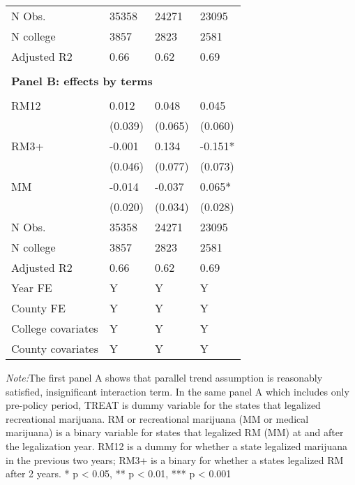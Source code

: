 \documentclass[12pt]{article}%
\begin{document}
\begin{table}
\begin{threeparttable}
\begin{tabular}{llll}
\cline{2-4} 
N Obs. & 35358 & 24271 & 23095 \\
N college & 3857 & 2823 & 2581 \\
Adjusted R2 & 0.66 & 0.62 & 0.69 \\
\hline \\[-1.8ex] 
\multicolumn{4}{l}{\textbf{Panel B: effects by terms}}\\  \\[-1.8ex] 
RM12 & 0.012 & 0.048 & 0.045 \\
& (0.039) & (0.065) & (0.060) \\
RM3+ & -0.001 & 0.134 & -0.151* \\
& (0.046) & (0.077) & (0.073) \\
MM & -0.014 & -0.037 & 0.065* \\
& (0.020) & (0.034) & (0.028) \\
\cline{2-4} 
N Obs. & 35358 & 24271 & 23095 \\
N college & 3857 & 2823 & 2581 \\
Adjusted R2 & 0.66 & 0.62 & 0.69 \\
\midrule
Year FE & Y & Y & Y \\
County FE & Y & Y & Y \\
College covariates & Y & Y & Y \\
County covariates & Y & Y & Y \\
\bottomrule
\end{tabular}
  \end{threeparttable}
 
\end{table}
\FloatBarrier

\textit{Note:}The first panel A shows that parallel trend assumption is reasonably satisfied, insignificant interaction term. In the same panel A which includes only pre-policy period, TREAT is dummy variable for the states that legalized recreational marijuana. RM or recreational marijuana (MM or medical marijuana) is a binary variable for states that legalized RM (MM) at and after the legalization year. RM12 is a dummy for whether a state legalized marijuana in the previous two years; RM3+ is a binary for whether a states legalized RM after 2 years. 
* p \textless{} 0.05, ** p \textless{} 0.01, ***
p \textless{} 0.001
\end{document}
